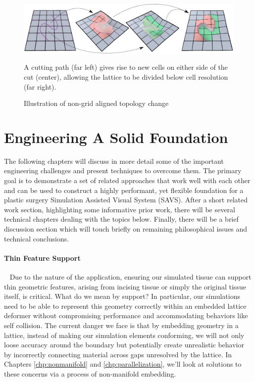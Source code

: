   
  \begin{figure}[b]
    \centering
    \includegraphics[width=.9\textwidth]{chapter_gridiron/images/New_HybridLattice2.pdf}
    \caption{Illustration of non-grid aligned topology change}{ A cutting path
    (far left) gives rise to new cells on either side of the cut
    (center), allowing the lattice to be divided below cell resolution
  (far right).}
    \label{Fig:MaterialContinuityPreview}
  \end{figure}
  
  \section{Engineering A Solid Foundation}

  The following chapters will discuss in more detail some of the
  important engineering challenges and present techniques to overcome
  them. The primary goal is to demonstrate a set of related approaches
  that work well with each other and can be used to construct a highly
  performant, yet flexible foundation for a plastic surgery
  Simulation Assisted Visual System (SAVS). After a short related work section, highlighting some
  informative prior work, there will be several technical chapters
  dealing with the topics below. Finally, there will be a brief
  discussion section which will touch briefly on remaining
  philosophical issues and technical conclusions.

    \paragraph{Thin Feature Support}~ Due to the nature of the
      application, ensuring our simulated tissue can support thin
      geometric features, arising from incising tissue or simply the
      original tissue itself, is critical. What do we mean by support?
      In particular, our simulations need to be able to represent this
      geometry correctly within an embedded lattice deformer without
      compromising performance and accommodating behaviors like self
      collision. The current danger we face is that by embedding
      geometry in a lattice, instead of making our simulation elements
      conforming, we will not only loose accuracy around the boundary
      but potentially create unrealistic behavior by incorrectly connecting
      material across gaps unresolved by the lattice. In Chapters
      \ref{chp:nonmanifold} and \ref{chp:parallelization}, we'll look at
      solutions to these concerns via a process of non-manifold embedding.

